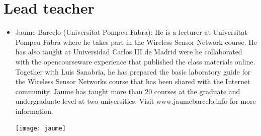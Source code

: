\documentclass[a4paper,oneside]{book}   %
\begin{document}
\section{Lead teacher}
\begin{itemize}
\item Jaume Barcelo (Universitat Pompeu Fabra): He is a lecturer at Universitat Pompeu Fabra where he takes part in the Wireless Sensor Network course. He has also taught at Universidad Carlos III de Madrid were he collaborated with the opencourseware experience that published the class materials online. Together with Luis Sanabria, he has prepared the basic laboratory guide for the Wireless Sensor Networks course that has been shared with the Internet community. Jaume has taught more than 20 courses at the graduate and undergraduate level at two universities. Visit www.jaumebarcelo.info for more information.
\begin{center}
\texttt{[image: jaume]}
\label{fig:jaume}
\end{center}
\end{itemize}
\end{document}

